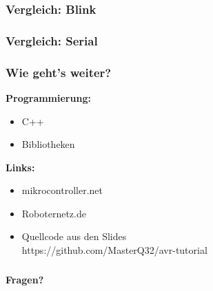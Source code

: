 \documentclass{beamer}
\begin{document}
\begin{frame}
\frametitle{Vergleich: Blink}
\end{frame}

\begin{frame}
\frametitle{Vergleich: Serial}
\end{frame}

\begin{frame}
\frametitle{Wie geht's weiter?}

\textbf{Programmierung:}
\begin{itemize}
\item C++
\item Bibliotheken
\end{itemize}

\textbf{Links:}
\begin{itemize}
\item mikrocontroller.net
\item Roboternetz.de
\item Quellcode aus den Slides\\https://github.com/MasterQ32/avr-tutorial
\end{itemize}
\end{frame}

\begin{frame}
\frametitle{}
\begin{center}
\Huge{\textbf{Fragen?}}
\end{center}
\end{frame}
\end{document}
